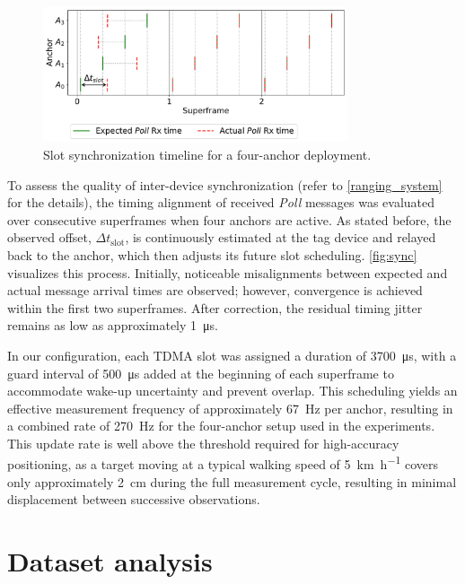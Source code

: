 \begin{figure}[tbh]
    \centering
    \includegraphics[width=0.8\textwidth]{Figures/experiments_and_results/sync_visualize.pdf}
    \caption[Slot synchronization timeline for a four-anchor deployment.]{Slot synchronization timeline for a four-anchor deployment.}
    \label{fig:sync}
\end{figure}

To assess the quality of inter-device synchronization (refer to \autoref{ranging_system} for the details), the timing alignment of received \textit{Poll} messages was evaluated over consecutive superframes when four anchors are active. As stated before, the observed offset, $\Delta t_{\text{slot}}$, is continuously estimated at the tag device and relayed back to the anchor, which then adjusts its future slot scheduling. \autoref{fig:sync} visualizes this process. Initially, noticeable misalignments between expected and actual message arrival times are observed; however, convergence is achieved within the first two superframes. After correction, the residual timing jitter remains as low as approximately \SI{1}{\micro\second}.

In our configuration, each TDMA slot was assigned a duration of \SI{3700}{\micro\second}, with a guard interval of \SI{500}{\micro\second} added at the beginning of each superframe to accommodate wake-up uncertainty and prevent overlap. This scheduling yields an effective measurement frequency of approximately \SI{67}{\hertz} per anchor, resulting in a combined rate of \SI{270}{\hertz} for the four-anchor setup used in the experiments. This update rate is well above the threshold required for high-accuracy positioning, as a target moving at a typical walking speed of \SI[per-mode=symbol]{5}{\kilo\metre\per\hour} covers only approximately \SI{2}{\centi\metre} during the full measurement cycle, resulting in minimal displacement between successive observations.

\section{Dataset analysis}

